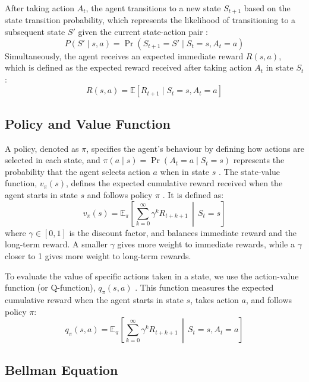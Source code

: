 \documentclass[
  authoryear,
  preprint]{elsarticle}
\begin{document}
After taking action \(A_t\), the agent transitions to a new state
\(S_{t+1}\) based on the state transition probability, which represents
the likelihood of transitioning to a subsequent state \(S'\) given the
current state-action pair \citep{SuttonBarto2020}: \[
P(S' \mid s, a) = \Pr(S_{t+1} = S' \mid S_t = s, A_t = a)
\] Simultaneously, the agent receives an expected immediate reward
\(R(s, a)\), which is defined as the expected reward received after
taking action \(A_t\) in state \(S_t\) \citep{SuttonBarto2020}: \[
R(s,a) = \mathbb{E}\left[ R_{t+1} \mid S_t = s, A_t = a \right]
\]

\subsection{Policy and Value Function}\label{policy-and-value-function}

A policy, denoted as \(\pi\), specifies the agent's behaviour by
defining how actions are selected in each state, and
\(\pi(a \mid s) = \Pr(A_t = a \mid S_t = s)\) represents the probability
that the agent selects action \(a\) when in state \(s\)
\citep{SuttonBarto2020}. The state-value function, \(v_\pi(s)\), defines
the expected cumulative reward received when the agent starts in state
\(s\) and follows policy \(\pi\) \citep{SuttonBarto2020}. It is defined
as: \[
v_\pi(s) = \mathbb{E}_\pi \left[ \sum_{k=0}^{\infty} \gamma^k R_{t+k+1} \,\middle|\, S_t = s \right]
\] where \(\gamma \in [0, 1]\) is the discount factor, and balances
immediate reward and the long-term reward. A smaller \(\gamma\) gives
more weight to immediate rewards, while a \(\gamma\) closer to 1 gives
more weight to long-term rewards.

To evaluate the value of specific actions taken in a state, we use the
action-value function (or Q-function), \(q_\pi(s,a)\)
\citep{SuttonBarto2020}. This function measures the expected cumulative
reward when the agent starts in state \(s\), takes action \(a\), and
follows policy \(\pi\): \[
q_\pi(s,a) = \mathbb{E}_\pi \left[ \sum_{k=0}^{\infty} \gamma^k R_{t+k+1} \,\middle|\, S_t = s, A_t = a \right]
\]

\subsection{Bellman Equation}\label{bellman-equation}
\end{document}
